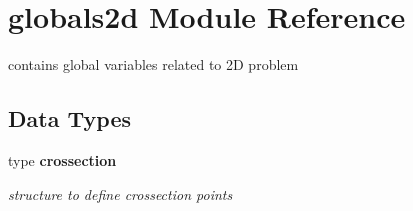 \section{globals2d Module Reference}
\label{namespaceglobals2d}


contains global variables related to 2D problem  


\subsection*{Data Types}
\begin{DoxyCompactItemize}
\item 
type {\bf crossection}
\begin{DoxyCompactList}\small\item\em structure to define crossection points \end{DoxyCompactList}\end{DoxyCompactItemize}
